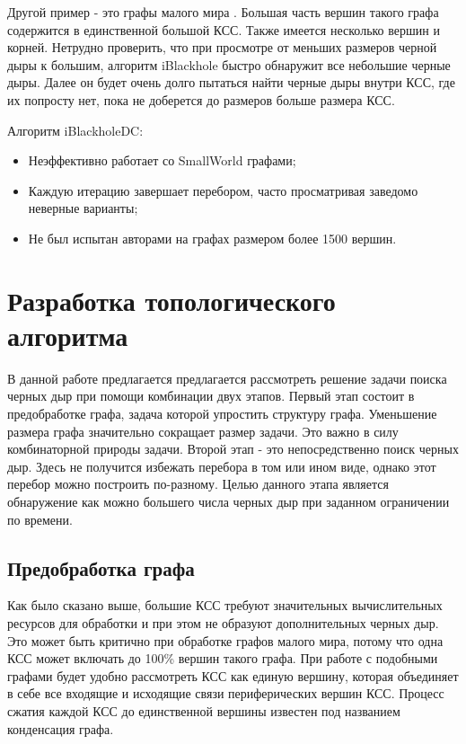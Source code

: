 \documentclass[12pt,a4paper,oneside,openany]{article}
\theoremstyle{definition}
\theoremstyle{lemma}
\theoremstyle{remark}
\begin{document}
Другой пример - это графы малого мира \cite{watts1999networks}.
Большая часть вершин такого графа содержится в единственной большой КСС.
Также имеется несколько вершин и корней.
Нетрудно проверить, что при просмотре от меньших размеров черной дыры к большим,
алгоритм iBlackhole быстро обнаружит все небольшие черные дыры.
Далее он будет очень долго пытаться найти черные дыры внутри КСС,
где их попросту нет, пока не доберется до размеров больше размера КСС.

Алгоритм iBlackholeDC:
    \begin{itemize}
        \item Неэффективно работает со SmallWorld графами;
        \item Каждую итерацию завершает перебором, часто просматривая заведомо неверные варианты;
        \item Не был испытан авторами на графах размером более 1500 вершин.
    \end{itemize}

\cleardoublepage
\section{Разработка топологического алгоритма}\label{sec:topalgodesign}

В данной работе предлагается предлагается рассмотреть решение задачи поиска черных дыр при помощи комбинации двух этапов.
Первый этап состоит в предобработке графа, задача которой упростить структуру графа.
Уменьшение размера графа значительно сокращает размер задачи. Это важно в силу комбинаторной природы задачи.
Второй этап - это непосредственно поиск черных дыр. Здесь не получится избежать перебора в том или ином виде,
однако этот перебор можно построить по-разному.
Целью данного этапа является обнаружение как можно большего числа черных дыр при заданном ограничении по времени.

\subsection{Предобработка графа}\label{subsec:graphpreprocessing}

Как было сказано выше, большие КСС требуют значительных вычислительных ресурсов для обработки и при этом не образуют дополнительных черных дыр.
Это может быть критично при обработке графов малого мира, потому что одна КСС может включать до 100\% вершин такого графа.
При работе с подобными графами будет удобно рассмотреть КСС как единую вершину,
которая объединяет в себе все входящие и исходящие связи периферических вершин КСС.
Процесс сжатия каждой КСС до единственной вершины известен под названием конденсация графа.
\end{document}
